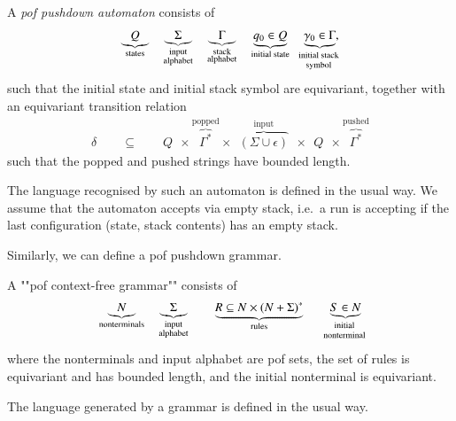  
 \begin{definition}\label{def:orbit-finite-pushdown}  
	A \emph{pof pushdown automaton}  consists of 
	\begin{align*}
  \underbrace{Q}_{\text{states}} \quad   \underbrace{\Sigma}_{\substack{\text{input}\\ \text{alphabet}}} \quad  \underbrace{\Gamma}_{\substack{\text{stack}\\ \text{alphabet}}} \quad    \underbrace{q_0 \in Q}_{\text{initial state}} \quad   \myunderbrace{\gamma_0 \in \Gamma}{initial stack\\ symbol},
\end{align*}
such that the initial state and initial stack symbol are equivariant, together with an equivariant transition relation
\begin{align*}
	\delta \qquad \subseteq \qquad  Q\ \  \times \overbrace{\Gamma^*}^{\text{popped}} \times \ \  \overbrace{(\Sigma \cup \epsilon)}^{\text{input}} \ \  \times \ \  Q\ \  \times \overbrace{\Gamma^*}^{\text{pushed}}
\end{align*}
such that the popped and pushed strings have bounded length.
\end{definition}

The language recognised by such an automaton is defined in the usual way.  We assume that the automaton accepts via empty stack, i.e.~a run is accepting if the last configuration (state, stack contents) has an empty stack.  

Similarly, we can define a pof pushdown grammar.
\begin{definition}
	A ""pof context-free grammar"" consists of 
	\begin{align*}
		\underbrace{N}_{\text{nonterminals}} \quad   \underbrace{\Sigma}_{\substack{\text{input}\\ \text{alphabet}}}  \qquad  \underbrace{R \subseteq N \times (N + \Sigma)^*}_{\text{rules}} 
		\qquad \myunderbrace{S \in N}{initial\\ nonterminal}
	  \end{align*}
	where the nonterminals and input alphabet are pof sets, the set of rules is equivariant and has bounded length, and the initial nonterminal is equivariant.
\end{definition}
The language generated by a grammar  is defined in the usual way. 




